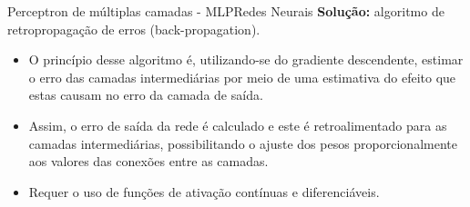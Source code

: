 \documentclass[t]{beamer}
\begin{document}

\begin{ftst}{Perceptron de múltiplas camadas - MLP}{Redes Neurais}
\textbf{Solução:} algoritmo de retropropagação de erros (back-propagation).
\vone
\begin{itemize}
    \item O princípio desse algoritmo é, utilizando-se do gradiente descendente, estimar o erro das camadas intermediárias por meio de uma estimativa do efeito que estas causam no erro da camada de saída.
    \item Assim, o erro de saída da rede é calculado e este é retroalimentado para as camadas intermediárias, possibilitando o ajuste dos pesos proporcionalmente aos valores das conexões entre as camadas.
    \item Requer o uso de funções de ativação contínuas e diferenciáveis.

\end{itemize}


\end{ftst}

\end{document}
